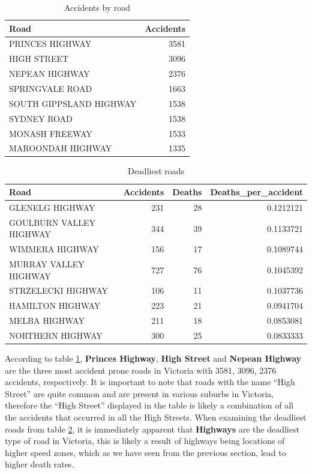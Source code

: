 \documentclass[11pt,a4paper,]{article}
\begin{document}
\begin{table}

\caption{\label{tab:accidents-by-road}Accidents by road}
\centering
\begin{tabular}[t]{l|r}
\hline
Road & Accidents\\
\hline
PRINCES HIGHWAY & 3581\\
\hline
HIGH STREET & 3096\\
\hline
NEPEAN HIGHWAY & 2376\\
\hline
SPRINGVALE ROAD & 1663\\
\hline
SOUTH GIPPSLAND HIGHWAY & 1538\\
\hline
SYDNEY ROAD & 1538\\
\hline
MONASH FREEWAY & 1533\\
\hline
MAROONDAH HIGHWAY & 1335\\
\hline
\end{tabular}
\end{table}

\begin{table}

\caption{\label{tab:deadliest-road}Deadliest roads}
\centering
\begin{tabular}[t]{l|r|r|r}
\hline
Road & Accidents & Deaths & Deaths\_per\_accident\\
\hline
GLENELG HIGHWAY & 231 & 28 & 0.1212121\\
\hline
GOULBURN VALLEY HIGHWAY & 344 & 39 & 0.1133721\\
\hline
WIMMERA HIGHWAY & 156 & 17 & 0.1089744\\
\hline
MURRAY VALLEY HIGHWAY & 727 & 76 & 0.1045392\\
\hline
STRZELECKI HIGHWAY & 106 & 11 & 0.1037736\\
\hline
HAMILTON HIGHWAY & 223 & 21 & 0.0941704\\
\hline
MELBA HIGHWAY & 211 & 18 & 0.0853081\\
\hline
NORTHERN HIGHWAY & 300 & 25 & 0.0833333\\
\hline
\end{tabular}
\end{table}

According to table \ref{tab:accidents-by-road}, \textbf{Princes Highway}, \textbf{High Street} and \textbf{Nepean Highway} are the three most accident prone roads in Victoria with 3581, 3096, 2376 accidents, respectively. It is important to note that roads with the name ``High Street'' are quite common and are present in various suburbs in Victoria, therefore the ``High Street'' displayed in the table is likely a combination of all the accidents that occurred in all the High Streets. When examining the deadliest roads from table \ref{tab:deadliest-road}, it is immediately apparent that \textbf{Highways} are the deadliest type of road in Victoria, this is likely a result of highways being locations of higher speed zones, which as we have seen from the previous section, lead to higher death rates.
\end{document}
